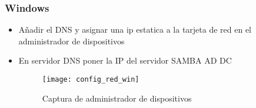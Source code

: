 \documentclass[../main.tex]{subfiles}
\begin{document}
\newpage{}



\subsubsection{Windows}\label{sec:cliente_win}

\begin{itemize}
  \item Añadir el DNS y asignar una ip estatica a la tarjeta de red en el administrador de dispositivos
  \item En servidor DNS poner la IP del servidor SAMBA AD DC
        \begin{figure}[H]
          \centering
          \texttt{[image: config\_red\_win]}
          \caption{Captura de administrador de dispositivos}\label{fig:confrwin}
        \end{figure}

\end{itemize}

\newpage{}
\end{document}
